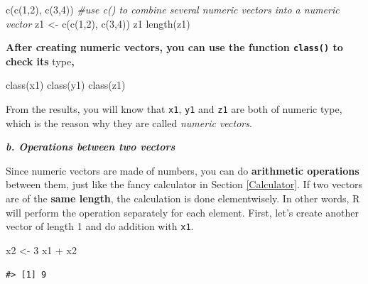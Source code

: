\documentclass[
]{book}
\newenvironment{Shaded}{\begin{snugshade}}{\end{snugshade}}
\newcommand{\CommentTok}[1]{\textcolor[rgb]{0.56,0.35,0.01}{\textit{#1}}}
\newcommand{\DecValTok}[1]{\textcolor[rgb]{0.00,0.00,0.81}{#1}}
\newcommand{\FunctionTok}[1]{\textcolor[rgb]{0.00,0.00,0.00}{#1}}
\newcommand{\NormalTok}[1]{#1}
\newcommand{\OtherTok}[1]{\textcolor[rgb]{0.56,0.35,0.01}{#1}}
\newcommand{\SpecialCharTok}[1]{\textcolor[rgb]{0.00,0.00,0.00}{#1}}
\begin{document}
\begin{Shaded}
\begin{Highlighting}[]
\FunctionTok{c}\NormalTok{(}\FunctionTok{c}\NormalTok{(}\DecValTok{1}\NormalTok{,}\DecValTok{2}\NormalTok{), }\FunctionTok{c}\NormalTok{(}\DecValTok{3}\NormalTok{,}\DecValTok{4}\NormalTok{))          }\CommentTok{\#use c() to combine several numeric vectors into a numeric vector}
\NormalTok{z1 }\OtherTok{\textless{}{-}} \FunctionTok{c}\NormalTok{(}\FunctionTok{c}\NormalTok{(}\DecValTok{1}\NormalTok{,}\DecValTok{2}\NormalTok{), }\FunctionTok{c}\NormalTok{(}\DecValTok{3}\NormalTok{,}\DecValTok{4}\NormalTok{))}
\NormalTok{z1}
\FunctionTok{length}\NormalTok{(z1)}
\end{Highlighting}
\end{Shaded}

\textbf{After creating numeric vectors, you can use the function \texttt{class()} to check its }type\textbf{,}

\begin{Shaded}
\begin{Highlighting}[]
\FunctionTok{class}\NormalTok{(x1)}
\FunctionTok{class}\NormalTok{(y1) }
\FunctionTok{class}\NormalTok{(z1)}
\end{Highlighting}
\end{Shaded}

From the results, you will know that \texttt{x1}, \texttt{y1} and \texttt{z1} are both of numeric type, which is the reason why they are called \emph{numeric vectors}.

\textbf{\emph{b. Operations between two vectors}}

Since numeric vectors are made of numbers, you can do \textbf{arithmetic operations} between them, just like the fancy calculator in Section \ref{Calculator}. If two vectors are of the \textbf{same length}, the calculation is done elementwisely. In other words, R will perform the operation separately for each element. First, let's create another vector of length 1 and do addition with \texttt{x1}.

\begin{Shaded}
\begin{Highlighting}[]
\NormalTok{x2 }\OtherTok{\textless{}{-}} \DecValTok{3}
\NormalTok{x1 }\SpecialCharTok{+}\NormalTok{ x2}
\end{Highlighting}
\end{Shaded}

\begin{verbatim}
#> [1] 9
\end{verbatim}
\end{document}
